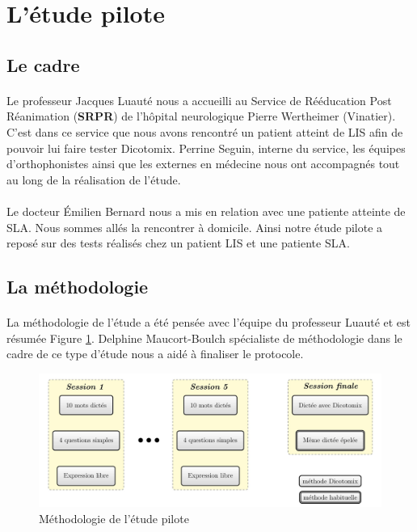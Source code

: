 \documentclass[11pt,a4paper]{article}
\theoremstyle{plain}
\theoremstyle{definition}
\begin{document}
\section{L'étude pilote}

\subsection{Le cadre}

\paragraph{} Le professeur Jacques Luauté nous a accueilli au Service de Rééducation Post Réanimation (\textbf{SRPR}) de l'hôpital neurologique Pierre Wertheimer (Vinatier). C'est dans ce service que nous avons rencontré un patient atteint de LIS afin de pouvoir lui faire tester Dicotomix. 
Perrine Seguin, interne du service, les équipes d'orthophonistes ainsi que les externes en médecine nous ont accompagnés tout au long de la réalisation de l'étude.

\paragraph{} Le docteur Émilien Bernard nous a mis en relation avec une patiente atteinte de SLA. Nous sommes allés la rencontrer à domicile. Ainsi notre étude pilote a reposé sur des tests réalisés chez un patient LIS et une patiente SLA.

\subsection{La méthodologie}

\paragraph{} La méthodologie de l'étude a été pensée avec l'équipe du professeur Luauté et est résumée Figure \ref{etude}. Delphine Maucort-Boulch spécialiste de méthodologie 
dans le cadre de ce type d'étude nous a aidé à finaliser le protocole.

\begin{figure}[h!]
\centering
\includegraphics[width=16cm]{images/schemaEtudePilote.jpg}
\caption{Méthodologie de l'étude pilote}
\label{etude}
\end{figure}
\end{document}
